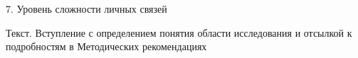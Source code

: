 \begin{frame}{7. Уровень сложности личных связей }

Текст. Вступление с определением понятия области исследования и отсылкой к подробностям в Методических рекомендациях

\end{frame}


